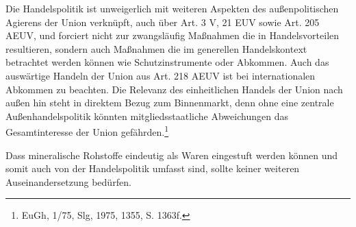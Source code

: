 \documentclass[12pt,a4paper,oneside]{book} %
\begin{document}
Die Handelspolitik ist unweigerlich mit weiteren Aspekten des außenpolitischen Agierens der Union verknüpft, auch über Art. 3 V, 21 EUV sowie Art. 205 AEUV, und forciert nicht zur zwangsläufig Maßnahmen die in Handelsvorteilen resultieren, sondern auch Maßnahmen die im generellen Handelskontext betrachtet werden können wie Schutzinstrumente oder Abkommen.\autocite{Callies/Ruffert, Art. 206, Rn 3.} Auch das auswärtige Handeln der Union aus Art. 218 AEUV ist bei internationalen Abkommen zu beachten. Die Relevanz des einheitlichen Handels der Union nach außen hin steht in direktem Bezug zum Binnenmarkt, denn ohne eine zentrale Außenhandelspolitik könnten mitgliedsstaatliche Abweichungen das Gesamtinteresse der Union gefährden.\footnote{EuGh, 1/75, Slg, 1975, 1355, S. 1363f.}

Dass mineralische Rohstoffe eindeutig als Waren eingestuft werden können und somit auch von der Handelspolitik umfasst sind, sollte keiner weiteren Auseinandersetzung bedürfen.
	
\end{document}
